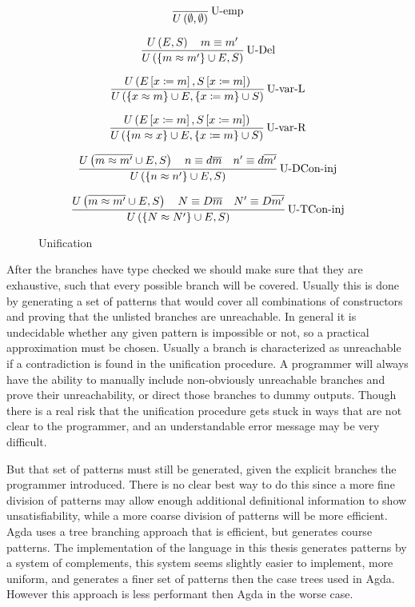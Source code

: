 \begin{figure}
\[
\frac{\,}{U\left(\emptyset,\emptyset\right)
}\operatorname{U-emp}
\]

\[
\frac{U\left(E,S\right)\quad m\equiv m'}{U\left(\left\{ m\approx m'\right\} \cup E,S\right)
}\operatorname{U-Del}
\]

\[
\frac{
  U\left(E\left[x\coloneqq m\right],S\left[x\coloneqq m\right]\right)
}{
  U\left(\left\{ x\approx m\right\} \cup E,\left\{x\coloneqq m\right\} \cup S \right)
}\operatorname{U-var-L}
\]

\[
\frac{
  U\left(E\left[x\coloneqq m\right],S\left[x\coloneqq m\right]\right)
}{
  U\left(\left\{ m\approx x\right\} \cup E, \left\{ x\coloneqq m\right\}  \cup S  \right)
}\operatorname{U-var-R}
\]

\[
\frac{
  U\left(\overline{m\approx m'}\cup E,S\right)\quad n\equiv d\overline{m}\quad n'\equiv d\overline{m'}
}{
  U\left(\left\{ n\approx n'\right\} \cup E,S\right)
}\operatorname{U-DCon-inj}
\]

\[
\frac{
  U\left(\overline{m\approx m'}\cup E,S\right)\quad N\equiv D\overline{m}\quad N'\equiv D\overline{m'}
}{
  U\left(\left\{ N\approx N'\right\} \cup E,S\right)
}\operatorname{U-TCon-inj}
\]
\caption{\SLang{} Unification}
\label{fig:surface-data-unification}
\end{figure}
After the branches have type checked we should make sure that they are exhaustive, such that every possible branch will be covered.
Usually this is done by generating a set of patterns that would cover all combinations of constructors and proving that the unlisted branches are unreachable.
In general it is undecidable whether any given pattern is impossible or not, so a practical approximation must be chosen.
Usually a branch is characterized as unreachable if a contradiction is found in the unification procedure.
A programmer will always have the ability to manually include non-obviously unreachable branches and prove their unreachability, or direct those branches to dummy outputs.
Though there is a real risk that the unification procedure gets stuck in ways that are not clear to the programmer, and an understandable error message may be very difficult.

But that set of patterns must still be generated, given the explicit branches the programmer introduced.
There is no clear best way to do this since a more fine division of patterns may allow enough additional definitional information to show unsatisfiability, while a more coarse division of patterns will be more efficient.
Agda uses a tree branching approach that is efficient, but generates course patterns.
The implementation of the language in this thesis generates patterns by a system of complements, this system seems slightly easier to implement, more uniform, and generates a finer set of patterns then the case trees used in Agda.
However this approach is less performant then Agda in the worse case.

